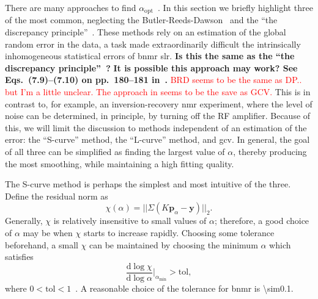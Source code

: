 There are many approaches to find $\alpha_\mathrm{opt}$~\cite{2001-Kilmer-SIAMJMAA-22-1204, 2011-Bauer-MCS-81-1795}. In this section we briefly highlight three of the most common, neglecting the Butler-Reeds-Dawson~\cite{1981-Butler-SIAMJNMA-18-381} and the ``the discrepancy principle''~\cite{1966-Morozon-DANSSR-167-510}. These methods rely on an estimation of the global random error in the data, a task made extraordinarily difficult the intrinsically inhomogeneous statistical errors of \gls{bnmr} \gls{slr}.
\textbf{Is this the same as the ``the discrepancy principle''~\cite{1966-Morozon-DANSSR-167-510}?}
\textbf{It is possible this approach may work? See Eqs.~(7.9)--(7.10) on pp.~180--181 in~\cite{1998-Hansen-RDDIPP}.}
\textcolor{red}{BRD seems to be the same as DP.. but I'm a little unclear. The approach in  seems to be the save as GCV.}
This is in contrast to, for example, an inversion-recovery \gls{nmr} experiment, where the level of noise can be determined, in principle, by turning off the RF amplifier. Because of this, we will limit the discussion to methods independent of an  estimation of the error: the ``S-curve'' method, the ``L-curve'' method, and \gls{gcv}. In general, the goal of all three can be simplified as finding the largest value of $\alpha$, thereby producing the most smoothing, while maintaining a high fitting quality. 

The S-curve method is perhaps the simplest and most intuitive of the three. Define the residual norm as
%
\begin{equation} \label{eq:chi}
   \chi(\alpha) = || \Sigma \left ( K \mathbf{p}_\alpha - \mathbf{y} \right ) ||_2.
\end{equation}
%
Generally, $\chi$ is relatively insensitive to small values of $\alpha$; therefore, a good choice of $\alpha$ may be when $\chi$ starts to increase rapidly. Choosing some tolerance beforehand, a small $\chi$ can be maintained by choosing the minimum $\alpha$ which satisfies
%
\begin{equation}\label{eq:L-opt}
\frac{\mathrm{d}\log\chi}{\mathrm{d}\log\alpha}\Bigg|_{\alpha_\mathrm{min}} > \mathrm{tol},
\end{equation}
%
where $0<\mathrm{tol}<1$~\cite{Zou2016}. A reasonable choice of the tolerance for \gls{bnmr} is \num{\sim0.1}.

